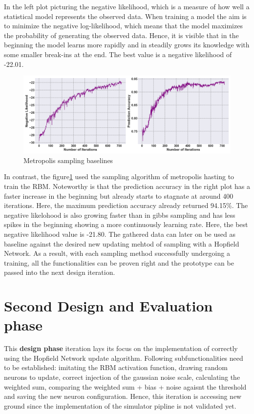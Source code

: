 In the left plot picturing the negative likelihood, which is a measure of how well a statistical model represents the observed data.
When training a model the aim is to minimize the negative log-likelihood, which means that the model maximizes the probability of generating the observed data.
Hence, it is visible that in the beginning the model learns more rapidly and in steadily grows its knowledge with some smaller break-ins at the end.
The best value is a negative likelihood of -22.01.
\begin{figure}[H]
    \centering
    \includegraphics[width=1\linewidth]{graphics/metropolis_combined_plot.png}
    \caption{Metropolis sampling baselines}
    \label{metropolis_baselines}
\end{figure}
In contrast, the figure\ref{metropolis_baselines} used the sampling algorithm of metropolis hasting to train the \ac{RBM}.
Noteworthy is that the prediction accuracy in the right plot has a faster increase in the beginning but already starts to stagnate at around 400 iterations. 
Here, the maximum prediction accuracy already returned 94.15\%. 
The negative likelohood is also growing faster than in gibbs sampling and has less spikes in the beginning showing a more continuously learning rate.
Here, the best negative likelihood value is -21.80.
The gathered data can later on be used as baseline against the desired new updating mehtod of sampling with a Hopfield Network.
As a result, with each sampling method successfully undergoing a training, all the functionalities can be proven right and the prototype can be passed 
into the next design iteration.


\section{Second Design and Evaluation phase}

This \textbf{design phase} iteration lays its focus on the implementation of correctly using the Hopfield Network update algorithm. 
Following subfunctionalities need to be established: imitating the \ac{RBM} activation function, drawing random neurons to update,
correct injection of the gaussian noise scale, calculating the weighted sum,
comparing the weighted sum + bias + noise agaisnt the threshold and saving the new neuron configuration.
Hence, this iteration is accessing new ground since the implementation of the simulator pipline is not validated yet. 

